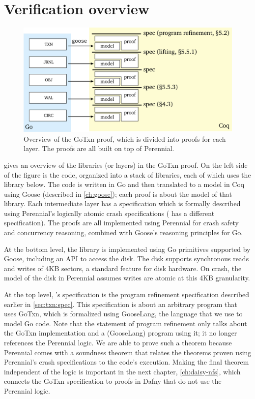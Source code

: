 \section{Verification overview}%
\label{sec:txn:overview}

\begin{figure}
  \centering
  \includegraphics{fig/gotxn.png}
  \caption{Overview of the GoTxn proof, which is divided into proofs for each
    layer. The proofs are all built on top of Perennial.}
  \label{fig:txn:proof-overview}
\end{figure}

 gives an overview of the libraries (or layers) in
the GoTxn proof. On the left side of the figure is the code, organized into a
stack of libraries, each of which uses the library below. The code is written in
Go and then translated to a model in Coq using Goose (described in
\cref{ch:goose}); each proof is about the model of that library. Each
intermediate layer has a specification which is formally described using
Perennial's logically atomic crash specifications ( has a different
specification). The proofs are all implemented using Perennial for crash safety
and concurrency reasoning, combined with Goose's reasoning principles for Go.

At the bottom level, the  library is implemented using Go primitives
supported by Goose, including an API to access the disk. The disk supports
synchronous reads and writes of 4KB sectors, a standard feature for disk
hardware. On crash, the model of the disk in Perennial assumes writes are atomic
at this 4KB granularity.

At the top level, 's specification is the program refinement
specification described earlier in \cref{sec:txn:spec}. This specification is
about an arbitrary program that uses GoTxn, which is formalized using GooseLang,
the language that we use to model Go code. Note that the statement of program
refinement only talks about the GoTxn implementation and a (GooseLang) program
using it; it no longer references the Perennial logic. We are able to prove such
a theorem because Perennial comes with a soundness theorem that relates the
theorems proven using Perennial's crash specifications to the code's execution.
Making the final theorem independent of the logic is important in the next
chapter, \cref{ch:daisy-nfs}, which connects the GoTxn specification to proofs
in Dafny that do not use the Perennial logic.
